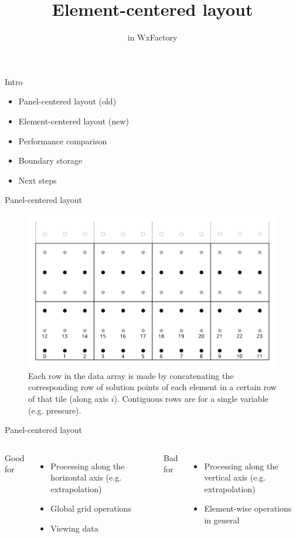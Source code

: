 \documentclass{beamer}
\begin{document}
\title{Element-centered layout}

\subtitle{in WxFactory}
\begin{frame}
    \titlepage
\end{frame}

\begin{frame}{Intro}
\begin{itemize}
    \item Panel-centered layout (old)
    \item Element-centered layout (new)
    \item Performance comparison
    \item Boundary storage
    \item Next steps
\end{itemize}
\end{frame}

\begin{frame}{Panel-centered layout}
\begin{figure}
    \includegraphics[scale=0.7]{img/variable_storage}
    \caption{Each row in the data array is made by concatenating the corresponding row of solution points of
             each element in a certain row of that tile (along axis $i$).
             Contiguous rows are for a single variable (e.g. pressure).}
\end{figure}
\end{frame}

\begin{frame}{Panel-centered layout}
\begin{columns}
Good for
    \begin{itemize}
        \item Processing along the horizontal axis (e.g. extrapolation)
        \item Global grid operations
        \item Viewing data
    \end{itemize}

Bad for
    \begin{itemize}
        \item Processing along the vertical axis (e.g. extrapolation)
        \item Element-wise operations in general
    \end{itemize}
\end{columns}
\end{frame}
\end{document}
